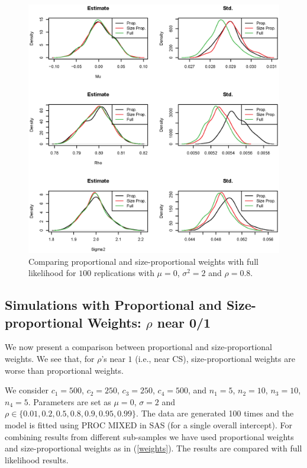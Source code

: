 \documentclass[11pt,a5paper,twoside]{book}
\begin{document}
{\begin{figure}[ht!]
\centering
\includegraphics[width=\textwidth]{rho3.eps}
\caption{Comparing proportional and size-proportional weights with full likelihood for $100$ replications with $\mu=0$, $\sigma^2=2$ and $\rho=0.8$.} \label{fig_rho3}
\end{figure}

\subsection{Simulations with Proportional and Size-proportional Weights: $\rho$ near 0/1}

We now present a comparison between proportional and size-proportional weights. We see that,  for $\rho$'s near $1$ (i.e., near CS), size-proportional weights are worse than proportional weights.

We consider $c_1=500$,  $c_2=250$, $c_3=250$, $c_4= 500$, and $n_1=5$, $n_2= 10$, $n_3= 10$, $n_4=  5$. Parameters are set as $\mu=0$, $\sigma=2$ and $\rho\in\{0.01,0.2,0.5,0.8,0.9,0.95,0.99\}$. The data are generated 100 times and the model is fitted using PROC MIXED in SAS (for a single overall intercept). For combining results from different sub-samples we have used proportional weights and size-proportional weights as in (\ref{weights}). The results are compared with full likelihood results.

}
\end{document}
